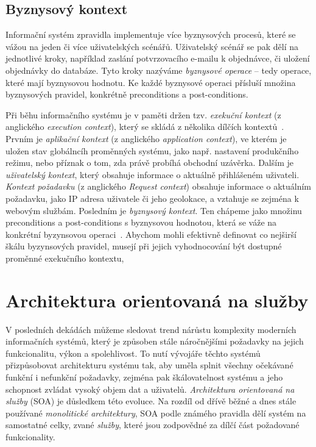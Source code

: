 \subsection{Byznysový kontext}

Informační systém zpravidla implementuje více byznysových procesů, které se vážou
na jeden či více uživatelských scénářů. Uživatelský scénář se pak dělí na jednotlivé
kroky, například zaslání potvrzovacího e-mailu k objednávce, či uložení objednávky
do databáze. Tyto kroky nazýváme \textit{byznysové operace} – tedy operace, které mají
byznysovou hodnotu. Ke každé byznysové operaci přísluší množina byznysových pravidel,
konkrétně preconditions a post-conditions.

Při běhu informačního systému je v paměti držen tzv. \textit{exekuční kontext} (z anglického \textit{execution context}),
který se skládá z několika dílčích kontextů~\cite{cemus2017separation}. Prvním
je \textit{aplikační kontext} (z anglického \textit{application context}), ve kterém je uložen stav globálncíh proměnných systému,
jako např. nastavení produkčního režimu, nebo příznak o tom, zda právě probíhá obchodní
uzávěrka. Dalším je \textit{uživatelský kontext}, který obsahuje informace o aktuálně
přihlášeném uživateli. \textit{Kontext požadavku} (z anglického \textit{Request context}) obsahuje
informace o aktuálním požadavku, jako IP adresa uživatele či jeho geolokace,
a vztahuje se zejména k webovým službám. Posledním je \textit{byznysový kontext}. Ten
chápeme jako množinu preconditions a post-conditions s byznysovou hodnotou, která se
váže na konkrétní byzynsovou operaci~\cite{cemus2015automated}.
Abychom mohli efektivně definovat co nejširší škálu byzynsových pravidel,
musejí při jejich vyhodnocování být dostupné proměnné exekučního kontextu,

\section{Architektura orientovaná na služby}

V posledních dekádách můžeme sledovat trend nárůstu komplexity
moderních informačních systémů, který je způsoben stále náročnějšími
požadavky na jejich funkcionalitu, výkon a spolehlivost. To nutí
vývojáře těchto systémů přizpůsobovat architekturu systému tak,
aby uměla splnit všechny očekávané funkční i nefunkční požadavky,
zejména pak škálovatelnost systému a jeho schopnost zvládat vysoký
objem dat a uživatelů. \textit{Architektura orientovaná na služby} (\gls{SOA}) je
důsledkem této evoluce. Na rozdíl od dřívě běžné a dnes
stále používané \textit{monolitické architektury},
\gls{SOA} podle známého pravidla 
dělí systém na samostatné celky, zvané \textit{služby}, které jsou
zodpovědné za dílčí část požadované funkcionality.

